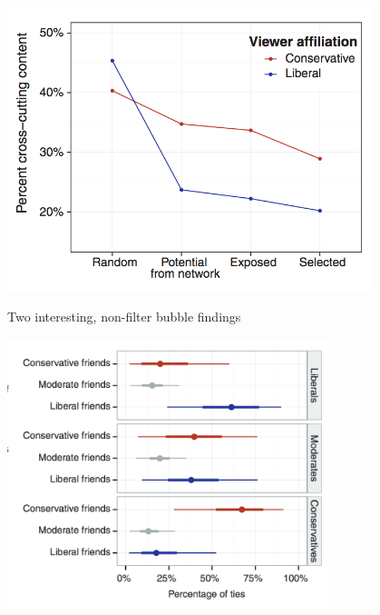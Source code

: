 \documentclass[aspectratio=169]{beamer}
\begin{document}
\begin{frame}

\begin{center}
\includegraphics[width=0.8\textwidth]{figures/bakshy_exposure_2015_fig3b}
\end{center}

\end{frame}
\begin{frame}

Two interesting, non-filter bubble findings

\end{frame}
\begin{frame}

\begin{center}
\includegraphics[width=0.70\textwidth]{figures/bakshy_exposure_2015_fig2}
\end{center}

\end{frame}
\end{document}
